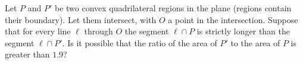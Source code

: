 Let $P$ and $P'$ be two convex quadrilateral regions in the plane (regions contain their boundary). Let them intersect, with $O$ a point in the intersection. Suppose that for every line $\ell$ through $O$ the segment $\ell\cap P$ is strictly longer than the segment $\ell\cap P'$. Is it possible that the ratio of the area of $P'$ to the area of $P$ is greater than $1.9$?